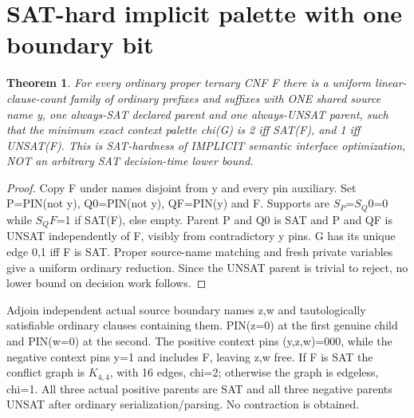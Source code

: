\documentclass[11pt]{article}
\newtheorem{theorem}{Theorem}
\begin{document}
\section{SAT-hard implicit palette with one boundary bit}
\begin{theorem}
For every ordinary proper ternary CNF F there is a uniform linear-clause-count family of ordinary prefixes and suffixes with ONE shared source name y, one always-SAT declared parent and one always-UNSAT parent, such that the minimum exact context palette chi(G) is 2 iff SAT(F), and 1 iff UNSAT(F). This is SAT-hardness of IMPLICIT semantic interface optimization, NOT an arbitrary SAT decision-time lower bound.
\end{theorem}
\begin{proof}
Copy F under names disjoint from y and every pin auxiliary. Set P=PIN(not y), Q0=PIN(not y), QF=PIN(y) and F. Supports are \(S_P\)=\(S_Q0\)={0} while \(S_QF\)={1} if SAT(F), else empty. Parent P and Q0 is SAT and P and QF is UNSAT independently of F, visibly from contradictory y pins. G has its unique edge {0,1} iff F is SAT. Proper source-name matching and fresh private variables give a uniform ordinary reduction. Since the UNSAT parent is trivial to reject, no lower bound on decision work follows.
\end{proof}
Adjoin independent actual source boundary names z,w and tautologically satisfiable ordinary clauses containing them. PIN(z=0) at the first genuine child and PIN(w=0) at the second. The positive context pins (y,z,w)=000, while the negative context pins y=1 and includes F, leaving z,w free. If F is SAT the conflict graph is \(K_{4,4}\), with 16 edges, chi=2; otherwise the graph is edgeless, chi=1. All three actual positive parents are SAT and all three negative parents UNSAT after ordinary serialization/parsing. No contraction is obtained.
\end{document}
